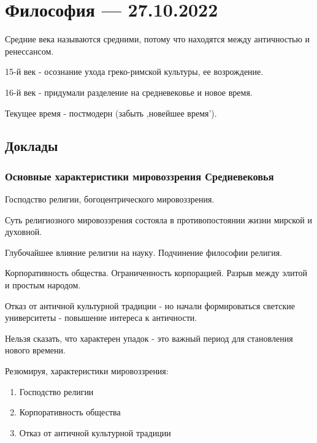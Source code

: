 \documentclass{article}
\begin{document}
\pagebreak
\section{Философия — 27.10.2022}

\begin{flushleft}

Средние века называются средними, потому что находятся между античностью и ренессансом.

\hfill

15-й век - осознание ухода греко-римской культуры, ее возрождение.

16-й век - придумали разделение на средневековье и новое время.

\hfill

Текущее время - постмодерн (забыть ,новейшее время').

\subsection{Доклады}

\subsubsection{Основные характеристики мировоззрения Средневековья}

Господство религии, богоцентрического мировоззрения.

Суть религиозного мировоззрения состояла в противопостоянии жизни мирской и духовной.

Глубочайшее влияние религии на науку. Подчинение философии религия.

Корпоративность общества. Ограниченность корпорацией. Разрыв между элитой и простым народом.

Отказ от античной культурной традиции - но начали формироваться светские университеты - повышение интереса к античности.

\hfill

Нельзя сказать, что характерен упадок - это важный период для становления нового времени.

Резюмируя, характеристики мировоззрения:

\begin{enumerate}
    \item Господство религии
    \item Корпоративность общества
    \item Отказ от античной культурной традиции
\end{enumerate}


\end{flushleft}
\end{document}
